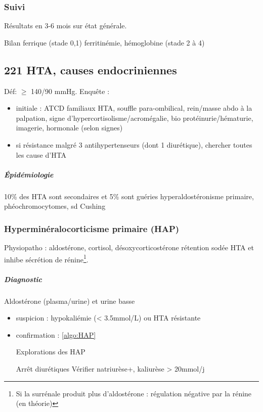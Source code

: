 \documentclass[11pt]{article}
\begin{document}
\subsubsection{Suivi}
\label{sec:orge05944a}
Résultats en 3-6 mois sur état générale. 

Bilan ferrique (stade 0,1) ferritinémie, hémoglobine (stade 2 à 4)

\subsection{221 HTA, causes endocriniennes}
\label{sec:org2cf7b91}
Déf: \(\ge\) 140/90 mmHg.
Enquête :
\begin{itemize}
\item initiale : ATCD familiaux HTA, souffle para-ombilical, rein/masse abdo à la
palpation, signe d'hypercortisolisme/acromégalie, bio \thus
protéinurie/hématurie, imagerie, hormonale (selon signes)
\item si résistance malgré 3 antihypertenseurs (dont 1 diurétique), chercher toutes
les cause d'HTA
\end{itemize}


\subparagraph{Épidémiologie}
\label{sec:orgf1aba97}
10\% des HTA sont secondaires et 5\% sont guéries \thus hyperaldostéronisme
primaire, phéochromocytomes, sd Cushing

\subsubsection{Hyperminéralocorticisme primaire (HAP)}
\label{sec:orgc0a605c}
Physiopatho : aldostérone, cortisol, désoxycorticostérone \thus rétention sodée
\thus HTA et inhibe sécrétion de rénine\footnote{Si la surrénale produit plus d'aldostérone : régulation négative par la rénine (en théorie)}.

\subparagraph{Diagnostic}
\label{sec:org2f09e00}
Aldostérone \inc (plasma/urine) et urine basse
\begin{itemize}
\item suspicion : hypokaliémie (< 3.5mmol/L) ou HTA résistante
\item confirmation : \ref{algo:HAP}  
\begin{algorithm}
  \caption{Explorations des HAP}
  \label{algo:HAP}
  Arrêt diurétiques\;
  Vérifier natriurèse+, kaliurèse > 20mmol/j\;
\end{algorithm}
\end{itemize}
\end{document}
